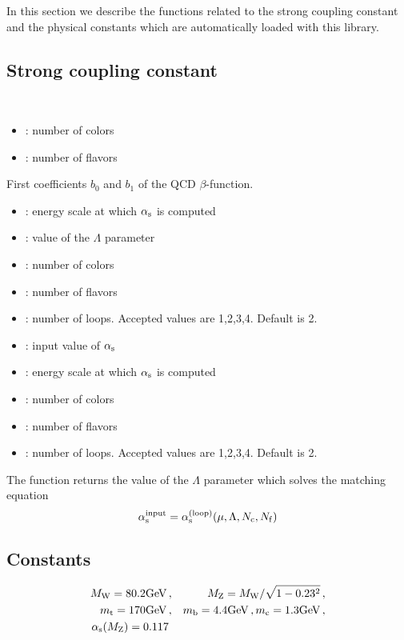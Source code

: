 
In this section we describe the functions related to the strong coupling constant
and the physical constants which are automatically loaded with this library.

\subsection{Strong coupling constant}

\\

\begin{itemize}
\item {}: number of colors
\item {}: number of flavors
\end{itemize}

First coefficients $b_0$ and $b_1$ of the QCD $\beta$-function.\\

\hrulefill


\begin{itemize}
\item {}: energy scale at which $\alpha_{\mathrm s}$ is computed
\item {}: value of the $\Lambda$ parameter
\item {}: number of colors
\item {}: number of flavors
\item {}: number of loops. Accepted values are 1,2,3,4. Default is 2.
\end{itemize}

\hrulefill


\begin{itemize}
\item {}: input value of $\alpha_{\mathrm s}$
\item {}: energy scale at which $\alpha_{\mathrm s}$ is computed
\item {}: number of colors
\item {}: number of flavors
\item {}: number of loops. Accepted values are 1,2,3,4. Default is 2.
\end{itemize}

The function returns the value of the $\Lambda$ parameter which solves the matching equation
\begin{equation}
\alpha_{\mathrm s}^\mathrm{input}  = \alpha_{\mathrm s}^\mathrm{(loop)}(\mu,\Lambda,N_{\mathrm c},N_{\mathrm f})
\end{equation}

\subsection{Constants}


\begin{eqnarray}
M_{\mathrm W} = 80.2 \mathrm{GeV} \, &,& M_{\mathrm Z} = M_{\mathrm W}/\sqrt{1-0.23^2} \,, \\ 
m_{\mathrm t} = 170 \mathrm{GeV} \, &,& m_{\mathrm b} = 4.4 \mathrm{GeV} \,, m_{\mathrm c} = 1.3 \mathrm{GeV} \,, \\
\alpha_{\mathrm s}(M_{\mathrm Z}) = 0.117
\end{eqnarray}
